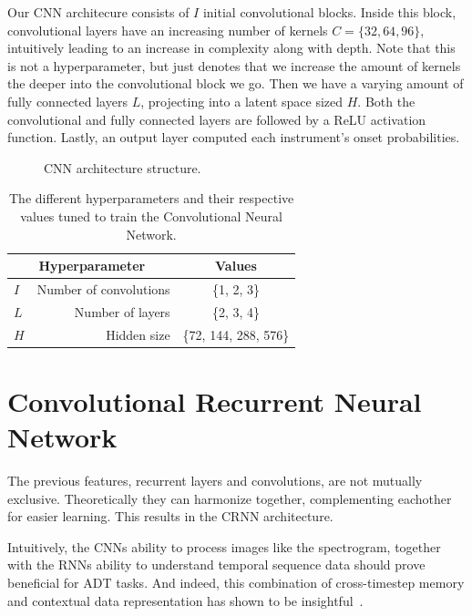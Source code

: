 Our \gls{CNN} architecure consists of $I$ initial convolutional blocks. Inside this block, convolutional layers have an increasing number of kernels $C = \{32, 64, 96\}$, intuitively leading to an increase in complexity along with depth. Note that this is not a hyperparameter, but just denotes that we increase the amount of kernels the deeper into the convolutional block we go. Then we have a varying amount of fully connected layers $L$, projecting into a latent space sized $H$. Both the convolutional and fully connected layers are followed by a \gls{ReLU} activation function. Lastly, an output layer computed each instrument's onset probabilities.

\begin{figure}[H]
    \centering
    
    \caption{CNN architecture structure.}
    \label{CNNFigure}
\end{figure}

\begin{table}[H]
    \centering
    \begin{tabular}{lr|c}
        \multicolumn{2}{c|}{Hyperparameter} & Values       \\
        \hline
        $I$ & Number of convolutions & \{1, 2, 3\}\\
        $L$ & Number of layers      & \{2, 3, 4\} \\
        $H$ & Hidden size      & \{72, 144, 288, 576\} \\
    \end{tabular}
    \caption{The different hyperparameters and their respective values tuned to train the Convolutional Neural Network.}
    \label{CNNHyperparams}
\end{table}

\section[Convolutional RNN]{Convolutional Recurrent Neural Network}

The previous features, recurrent layers and convolutions, are not mutually exclusive. Theoretically they can harmonize together, complementing eachother for easier learning. This results in the \gls{CRNN} architecture.

Intuitively, the \glspl{CNN} ability to process images like the spectrogram, together with the \glspl{RNN} ability to understand temporal sequence data should prove beneficial for \gls{ADT} tasks. And indeed, this combination of cross-timestep memory and contextual data representation has shown to be insightful~\cite{Vogl2017DrumTV, vogl2018multiinstrumentdrumtranscription, signals4040042}.

